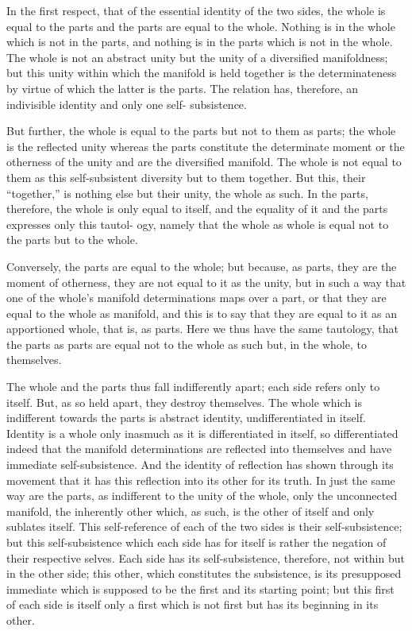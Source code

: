 In the first respect, that of the essential identity of the two sides, the
whole is equal to the parts and the parts are equal to the whole. Nothing is
in the whole which is not in the parts, and nothing is in the parts which
is not in the whole. The whole is not an abstract unity but the unity
of a diversified manifoldness; but this unity within which the manifold is
held together is the determinateness by virtue of which the latter is the
parts. The relation has, therefore, an indivisible identity and only one self-
subsistence.

But further, the whole is equal to the parts but not to them as parts; the
whole is the reflected unity whereas the parts constitute the determinate
moment or the otherness of the unity and are the diversified manifold.
The whole is not equal to them as this self-subsistent diversity but to
them together. But this, their “together,” is nothing else but their unity,
the whole as such. In the parts, therefore, the whole is only equal to
itself, and the equality of it and the parts expresses only this tautol-
ogy, namely that the whole as whole is equal not to the parts but to the
whole.

Conversely, the parts are equal to the whole; but because, as parts, they
are the moment of otherness, they are not equal to it as the unity, but in
such a way that one of the whole’s manifold determinations maps over a
part, or that they are equal to the whole as manifold, and this is to say that
they are equal to it as an apportioned whole, that is, as parts. Here we thus
have the same tautology, that the parts as parts are equal not to the whole as
such but, in the whole, to themselves.

The whole and the parts thus fall indifferently apart; each side refers
only to itself. But, as so held apart, they destroy themselves. The whole
which is indifferent towards the parts is abstract identity, undifferentiated
in itself. Identity is a whole only inasmuch as it is differentiated in itself,
so differentiated indeed that the manifold determinations are reflected
into themselves and have immediate self-subsistence. And the identity of
reflection has shown through its movement that it has this reflection into
its other for its truth.
In just the same way are the parts, as indifferent
to the unity of the whole, only the unconnected manifold, the inherently
other which, as such, is the other of itself and only sublates itself.
This self-reference of each of the two sides is their self-subsistence; but this
self-subsistence which each side has for itself is rather the negation of their
respective selves. Each side has its self-subsistence, therefore, not within
but in the other side; this other, which constitutes the subsistence, is its
presupposed immediate which is supposed to be the first and its starting
point; but this first of each side is itself only a first which is not first but
has its beginning in its other.

